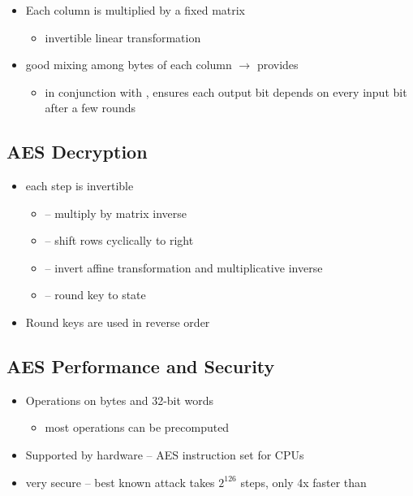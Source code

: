 \documentclass[draft]{article}
\begin{document}
\begin{multicols}{3}
    \subsubsection*{}
    \begin{itemize}[nosep]
        \item Each column is multiplied by a fixed matrix
              \begin{itemize}[nosep]
                  \item invertible linear transformation
              \end{itemize}
        \item good mixing among bytes of each column $\rightarrow$ provides 
              \begin{itemize}[nosep]
                  \item in conjunction with , ensures each output bit depends on every input bit after a few rounds
              \end{itemize}
    \end{itemize}
\end{multicols}
\subsection{AES Decryption}
\begin{itemize}[nosep]
    \item each step is invertible
          \begin{itemize}[nosep]
              \item {} -- multiply by matrix inverse
              \item {} -- shift rows cyclically to right
              \item {} -- invert affine transformation and multiplicative inverse
              \item {} --  round key to state
          \end{itemize}
    \item Round keys are used in reverse order
\end{itemize}
\subsection{AES Performance and Security}
\begin{itemize}[nosep]
    \item Operations on bytes and 32-bit words
          \begin{itemize}[nosep]\item most operations can be precomputed\end{itemize}
    \item Supported by hardware -- AES instruction set for CPUs
    \item very secure -- best known attack takes $2^{126}$ steps, only 4x faster than 
\end{itemize}
\end{document}

